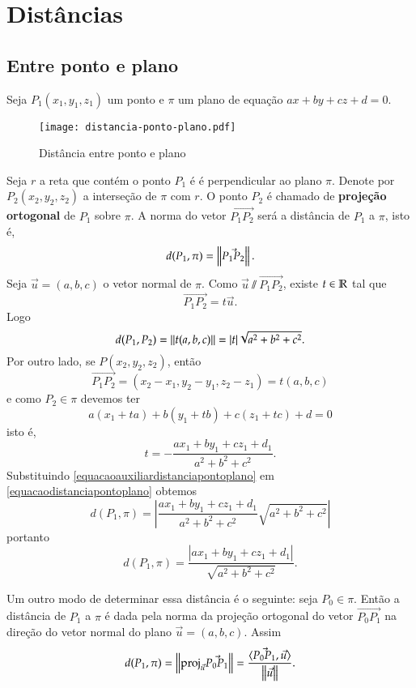 

\section{Dist\^ancias} %
\label{sec:distancias}
\subsection{Entre ponto e plano} %
\label{sub:entre_ponto_e_plano}
Seja $P_1(x_1,y_1,z_1)$ um ponto e $\pi$ um plano de equa\c{c}\~ao $ax + by + cz + d = 0$.
\begin{figure}[!h]
    \centering
    \caption{Dist\^ancia entre ponto e plano}
    \texttt{[image: distancia-ponto-plano.pdf]}
\end{figure}
Seja $r$ a reta que cont\'em o ponto $P_1$ \'e \'e perpendicular ao plano $\pi$. Denote por $P_2(x_2,y_2,z_2)$ a interse\c{c}\~ao de $\pi$ com $r$. O ponto $P_2$ \'e chamado de \textbf{proje\c{c}\~ao ortogonal} de $P_1$ sobre $\pi$. A norma do vetor $\vec{P_1P_2}$ ser\'a a dist\^ancia de $P_1$ a $\pi$, isto \'e,
\[
    d(P_1,\pi) = \left\Vert{\vec{P_1P_2}}\right\Vert.
\]
Seja $\vec{u} = (a,b,c)$ o vetor normal de $\pi$. Como $\vec{u}\varparallel\vec{P_1P_2}$, existe $t \in \mathbb{R}$ tal que
\[
    \vec{P_1P_2} = t\vec{u}.
\]
Logo
\begin{equation}\label{equacaodistanciapontoplano}
    d(P_1,P_2) = \left\Vert{t(a,b,c)}\right\Vert = |t|\sqrt{a^2 + b^2 + c^2}.
\end{equation}
Por outro lado, se $P(x_2, y_2, z_2)$, ent\~ao
\[
    \vec{P_1P_2} = (x_2 - x_1, y_2 - y_1, z_2 - z_1) = t(a,b,c)
\]
e como $P_2 \in \pi$ devemos ter
\[
    a(x_1 + ta) + b(y_1 + tb) + c(z_1 + tc) + d = 0
\]
isto \'e,
\begin{equation}\label{equacaoauxiliardistanciapontoplano}
    t = -\dfrac{ax_1 + by_1 + cz_1 + d_1}{a^2 + b^2 + c^2}.
\end{equation}
Substituindo \eqref{equacaoauxiliardistanciapontoplano} em \eqref{equacaodistanciapontoplano} obtemos
\[
    d(P_1,\pi) = \left|\dfrac{ax_1 + by_1 + cz_1 + d_1}{a^2 + b^2 + c^2}\sqrt{a^2 + b^2 + c^2}\right|
\]
portanto
\[
    d(P_1,\pi) = \dfrac{|ax_1 + by_1 + cz_1 + d_1|}{\sqrt{a^2 + b^2 + c^2}}.
\]

Um outro modo de determinar essa dist\^ancia \'e o seguinte: seja $P_0 \in \pi$. Ent\~ao a dist\^ancia de $P_1$ a $\pi$ \'e dada pela norma da proje\c{c}\~ao ortogonal do vetor $\vec{P_0P_1}$ na dire\c{c}\~ao do vetor normal do plano $\vec{u} = (a,b,c)$. Assim
\[
    d(P_1,\pi) = \left\Vert{{\rm proj}_{\vec{u}}\vec{P_0P_1}}\right\Vert = \dfrac{\langle\vec{P_0P_1},\vec{u}\rangle}{\left\Vert{\vec{u}}\right\Vert}.
\]

